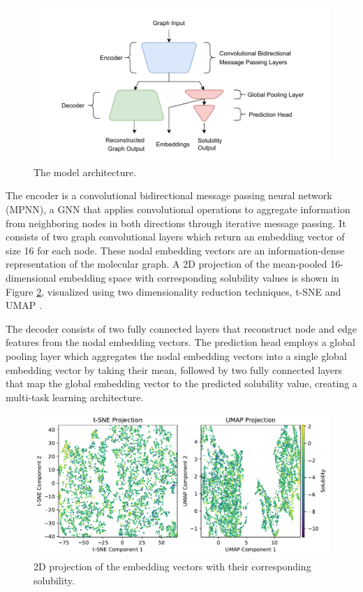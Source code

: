 \documentclass[11pt,a4paper]{article}
\begin{document}
\begin{figure}[htbp]
        \centering
        \includegraphics[width=1\textwidth]{model.pdf}
        \caption{The model architecture.}
        \label{fig:model}
\end{figure}

The encoder is a convolutional bidirectional message passing neural network (MPNN), a GNN that applies convolutional operations to aggregate information from neighboring nodes in both directions through iterative message passing. It consists of two graph convolutional layers which return an embedding vector of size 16 for each node. These nodal embedding vectors are an information-dense representation of the molecular graph. A 2D projection of the mean-pooled 16-dimensional embedding space with corresponding solubility values is shown in Figure \ref{fig:solubility}, visualized using two dimensionality reduction techniques, t-SNE \cite{van2008visualizing} and UMAP \cite{mcinnes2018umap}.

The decoder consists of two fully connected layers that reconstruct node and edge features from the nodal embedding vectors. The prediction head employs a global pooling layer which aggregates the nodal embedding vectors into a single global embedding vector by taking their mean, followed by two fully connected layers that map the global embedding vector to the predicted solubility value, creating a multi-task learning architecture.

\begin{figure}[htbp]
        \centering
        \includegraphics[width=1\textwidth]{solubility.pdf}
        \caption{2D projection of the embedding vectors with their corresponding solubility.}
        \label{fig:solubility}
\end{figure}
\end{document}
